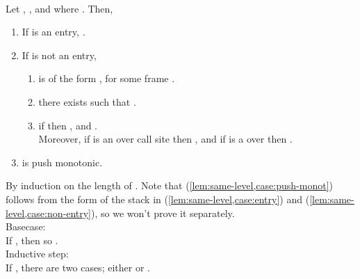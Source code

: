 \documentclass{LMCS}
\theoremstyle{definition} \newtheorem{property}[thm]{Property}
\begin{document}
\begin{lem}\label{lem:same-level} ~ \\
  Let , 
  , 
  and  where . 
  Then,
  \begin{enumerate}[\em(1)]
  \item\label{lem:same-level,case:entry}
    If \astat{} is an entry, .
  \item\label{lem:same-level,case:non-entry}
    If \astat{} is not an entry,
    \begin{enumerate}[\em(a)]
    \item\label{lem:same-level,case:non-entryo}
       is of the form , for some frame \tfenv.
    \item\label{lem:same-level,case:non-entryw}
      there exists  such that .
    \item\label{lem:same-level,case:non-entryh}
      if  then 
      ,  and
      . \\
      Moreover, if \astat{} is an \daeval{} over call site  
      then ,
      and if \astat{} is a \dacapply{} over \tw{(\ilam{\gamma}())} 
      then .
    \end{enumerate}
  \item\label{lem:same-level,case:push-monot}
     is push monotonic.
  \end{enumerate}
\end{lem}
\proof
By induction on the length  of .
Note that (\ref{lem:same-level,case:push-monot}) follows from the form of 
the stack in (\ref{lem:same-level,case:entry}) 
and (\ref{lem:same-level,case:non-entry}),
so we won't prove it separately. \\
Basecase: \\
If , then  so . \\
Inductive step: \\
If , there are two cases; either 
 or .
\end{document}

